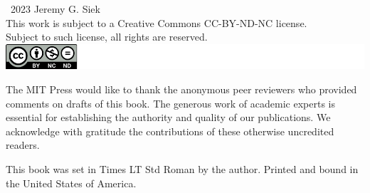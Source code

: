 \documentclass[7x10]{TimesAPriori_MIT}%
\numberwithin{theorem}{chapter}
\numberwithin{definition}{chapter}
\numberwithin{equation}{chapter}
\begin{document}
\begin{copyrightpage}
  \textcopyright\ 2023 Jeremy G. Siek \\[2ex]
  This work is subject to a Creative Commons CC-BY-ND-NC license. \\[2ex]
  Subject to such license, all rights are reserved. \\[2ex]
  \includegraphics{CCBY-logo}

The MIT Press would like to thank the anonymous peer reviewers who
provided comments on drafts of this book. The generous work of
academic experts is essential for establishing the authority and
quality of our publications. We acknowledge with gratitude the
contributions of these otherwise uncredited readers.

This book was set in Times LT Std Roman by the author. Printed and
bound in the United States of America.


\end{copyrightpage}
\end{document}

